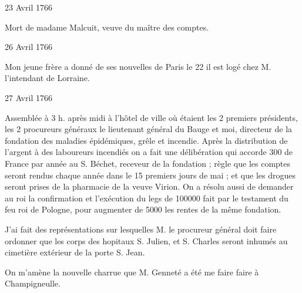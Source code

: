                     \begin{diary}{23 Avril 1766}{}

                         Mort de madame Malcuit, veuve du maître des
                              comptes.\bigskip


                     \end{diary}

                     \begin{diary}{26 Avril 1766}{}


                           Mon jeune frère a donné de
                           ses nouvelles
                           de Paris
                           le 22 il est logé chez
                           M. l'intendant
                              de Lorraine.
                        \bigskip


                     \end{diary}

                     \begin{diary}{27 Avril 1766}{}

                         Assemblée à 3 h. après midi à l'hôtel de ville
                           où étaient les 2
                              premiers présidents, les
                           2 procureurs généraux
                           le lieutenant général du
                              Bauge
                           et moi, directeur de la fondation des
                              maladies épidémiques, grêle et incendie.
                           Après la distribution de l'argent à des laboureurs
                           incendiés on a fait une délibération qui accorde
                           300 de France par année au S. Béchet, receveur
                           de la fondation ; règle que les comptes seront
                           rendus chaque année dans le 15 premiers
                           jours de mai ; et que les drogues seront
                           prises de la pharmacie de la veuve
                              Virion.
                           On a résolu aussi de demander au roi la
                           confirmation et l'exécution du legs de 100000
                           fait par le testament du feu
                              roi de Pologne,
                           pour augmenter de 5000 les rentes de la
                           même fondation. \bigskip


                         J'ai fait des représentations sur
                           lesquelles M. le
                              procureur général doit faire ordonner que les corps des
                           hopitaux S.
                              Julien, et S.
                              Charles seront inhumés
                           au cimetière
                              extérieur de la porte S. Jean. \bigskip


                         On m'amène la nouvelle charrue que
                           M. Genneté a été me faire faire
                           à
                           Champigneulle. \bigskip


                     \end{diary}

